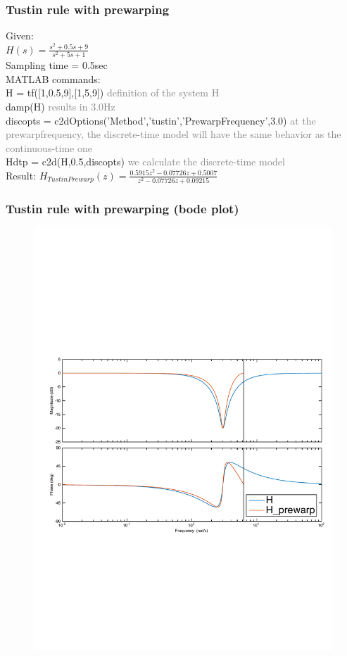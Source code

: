 \begin{frame}
	\frametitle{Tustin rule with prewarping}
	\begin{example}
		Given:\\
		$H(s) = \frac{s^{2} + 0.5s + 9}{s^{2} + 5s + 1}$\\
		Sampling time = 0.5sec\\
		\vspace{1em}
		MATLAB commands:\\
		H = tf([1,0.5,9],[1,5,9])	\textcolor{gray}{definition of the system H} \\
		damp(H)	\textcolor{gray}{results in 3.0Hz} \\
		discopts = c2dOptions('Method','tustin','PrewarpFrequency',3.0)	\textcolor{gray}{at the prewarpfrequency, the discrete-time model will have the same behavior as the continuous-time one}\\
		Hdtp = c2d(H,0.5,discopts)	\textcolor{gray}{we calculate the discrete-time model}\\
		\vspace{1em}
		Result:
		$H_{TustinPrewarp}(z) = \frac{0.5915z^{2} - 0.07726z + 0.5007}{z^{2} - 0.07726z + 0.09215}$
	\end{example}
\end{frame}

\begin{frame}
	\frametitle{Tustin rule with prewarping (bode plot)}
	\vspace{-0.7em}
	\begin{figure}
		\centering
		\includegraphics[width=1\linewidth]{distortion_bode3}
	\end{figure}
\end{frame}
